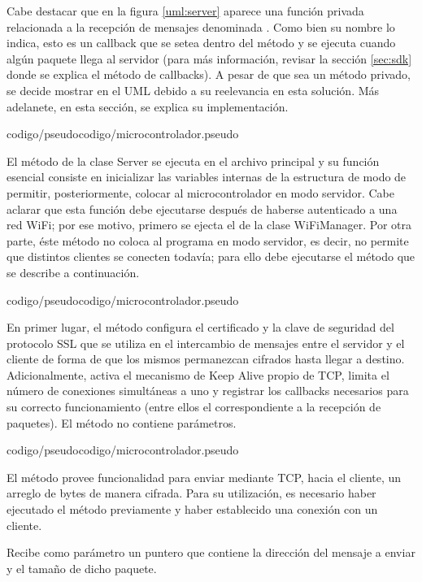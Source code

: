 Cabe destacar que en la figura \ref{uml:server} aparece una función privada relacionada a la recepción de mensajes denominada .
Como bien su nombre lo indica, esto es un callback que se setea dentro del método  y se ejecuta cuando algún paquete llega al servidor (para más información, revisar la sección \ref{sec:sdk} donde se explica el método de callbacks).
A pesar de que sea un método privado, se decide mostrar en el UML debido a su reelevancia en esta solución.
Más adelanete, en esta sección, se explica su implementación.

 {codigo/pseudocodigo/microcontrolador.pseudo}

El método  de la clase Server se ejecuta en el archivo principal y su función esencial consiste en inicializar las variables internas de la estructura de modo de permitir, posteriormente, colocar al microcontrolador en modo servidor.
Cabe aclarar que esta función debe ejecutarse después de haberse autenticado a una red WiFi; por ese motivo, primero se ejecta el  de la clase WiFiManager.
Por otra parte, éste método no coloca al programa en modo servidor, es decir, no permite que distintos clientes se conecten todavía; para ello debe ejecutarse el método  que se describe a continuación.

 {codigo/pseudocodigo/microcontrolador.pseudo}

En primer lugar, el método  configura el certificado y la clave de seguridad del protocolo SSL que se utiliza en el intercambio de mensajes entre el servidor y el cliente de forma de que los mismos permanezcan cifrados hasta llegar a destino.
Adicionalmente, activa el mecanismo de Keep Alive propio de TCP, limita el número de conexiones simultáneas a uno y registrar los callbacks necesarios para su correcto funcionamiento (entre ellos el correspondiente a la recepción de paquetes).
El método no contiene parámetros.

 {codigo/pseudocodigo/microcontrolador.pseudo}

El método  provee funcionalidad para enviar mediante TCP, hacia el cliente, un arreglo de bytes de manera cifrada.
Para su utilización, es necesario haber ejecutado el método  previamente y haber establecido una conexión con un cliente.

Recibe como parámetro un puntero que contiene la dirección del mensaje a enviar y el tamaño de dicho paquete.

